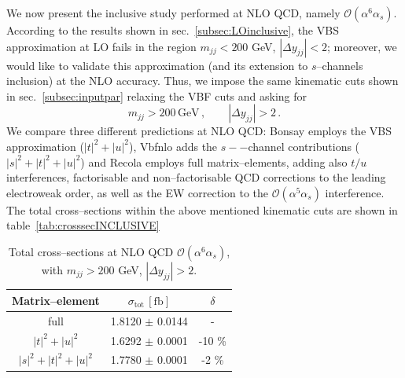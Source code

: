 We now present the inclusive study performed at NLO QCD, namely $\mathcal{O}(\alpha^6\alpha_s)$.\\
According to the results shown in sec.~\ref{subsec:LOinclusive}, the VBS approximation at LO fails in the region $m_{jj} < 200$ GeV, $|\Delta y_{jj}| < 2$; moreover, we would like to validate this approximation (and its extension to $s$--channels inclusion) at the NLO accuracy. Thus, we impose the same kinematic cuts shown in sec.~\ref{subsec:inputpar} relaxing the VBF cuts and asking for
\begin{equation}
	m_{jj} > 200 \,\textrm{GeV}\,,\qquad |\Delta y_{jj}| > 2\,.
\end{equation}
We compare three different predictions at NLO QCD: {\sc Bonsay} employs the VBS approximation ($|t|^2+|u|^2$), {\sc Vbfnlo} adds the $s--$channel contributions ($|s|^2+|t|^2+|u|^2$) and {\sc Recola} employs full matrix--elements, adding also $t/u$ interferences, factorisable and non--factorisable QCD corrections to the leading electroweak order, as well as the EW correction to the $\mathcal{O}(\alpha^5\alpha_s)$ interference. The total cross--sections within the above mentioned kinematic cuts are shown in table~\ref{tab:crosssecINCLUSIVE}
\begin{table}[h!]
\centering
\begin{tabular}{c|c|c} 
\bf Matrix--element & $\sigma_{\textrm{tot}}\,[\textrm{fb}]$ & $\delta$ \\
\hline
\hline
full &  1.8120 $\pm$ 0.0144 & - \\
\hline
$|t|^2 + |u|^2$ & 1.6292 $\pm$ 0.0001  &  -10 \% \\
\hline
$|s|^2 + |t|^2 + |u|^2$ & 1.7780 $\pm$ 0.0001  & -2 \%
\end{tabular}
\caption{Total cross--sections at NLO QCD $\mathcal{O}(\alpha^6\alpha_s)$, with $m_{jj}>200$ GeV, $|\Delta y_{jj}|>2$.}
\end{table}\label{tab:crosssecINCLUSIVE}


